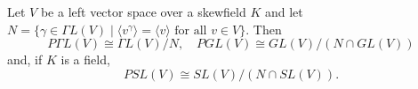 Let $V$ be a left vector space over a skewfield $K$ and let $N = \{\gamma \in \Gamma L(V) \mid \langle v^\gamma \rangle = \langle v \rangle \text{ for all } v \in V\}$. Then
$$P\Gamma L(V) \cong \Gamma L(V)/N, \quad PGL(V) \cong GL(V)/(N \cap GL(V))$$
and, if $K$ is a field,
$$PSL(V) \cong SL(V)/(N \cap SL(V)).$$
